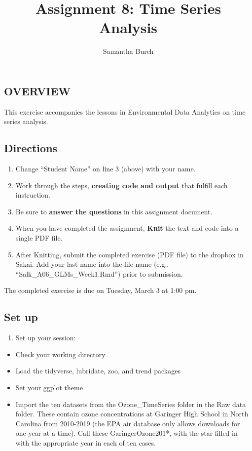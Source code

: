 \documentclass[]{article}
\title{Assignment 8: Time Series Analysis}
\author{Samantha Burch}
\date{}
\providecommand{\tightlist}{%
  \setlength{\itemsep}{0pt}\setlength{\parskip}{0pt}}
\begin{document}
\maketitle

\hypertarget{overview}{%
\subsection{OVERVIEW}\label{overview}}

This exercise accompanies the lessons in Environmental Data Analytics on
time series analysis.

\hypertarget{directions}{%
\subsection{Directions}\label{directions}}

\begin{enumerate}
\def\labelenumi{\arabic{enumi}.}
\tightlist
\item
  Change ``Student Name'' on line 3 (above) with your name.
\item
  Work through the steps, \textbf{creating code and output} that fulfill
  each instruction.
\item
  Be sure to \textbf{answer the questions} in this assignment document.
\item
  When you have completed the assignment, \textbf{Knit} the text and
  code into a single PDF file.
\item
  After Knitting, submit the completed exercise (PDF file) to the
  dropbox in Sakai. Add your last name into the file name (e.g.,
  ``Salk\_A06\_GLMs\_Week1.Rmd'') prior to submission.
\end{enumerate}

The completed exercise is due on Tuesday, March 3 at 1:00 pm.

\hypertarget{set-up}{%
\subsection{Set up}\label{set-up}}

\begin{enumerate}
\def\labelenumi{\arabic{enumi}.}
\tightlist
\item
  Set up your session:
\end{enumerate}

\begin{itemize}
\tightlist
\item
  Check your working directory
\item
  Load the tidyverse, lubridate, zoo, and trend packages
\item
  Set your ggplot theme
\item
  Import the ten datasets from the Ozone\_TimeSeries folder in the Raw
  data folder. These contain ozone concentrations at Garinger High
  School in North Carolina from 2010-2019 (the EPA air database only
  allows downloads for one year at a time). Call these
  GaringerOzone201*, with the star filled in with the appropriate year
  in each of ten cases.
\end{itemize}
\end{document}

